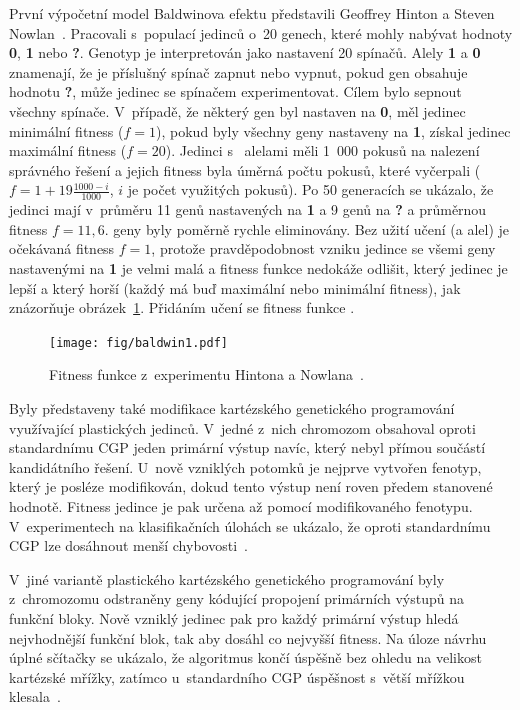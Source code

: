První výpočetní model Baldwinova efektu představili Geoffrey Hinton a Steven Nowlan~\cite{HintonNowlan}. Pracovali s~populací jedinců o~20 genech, které mohly nabývat hodnoty \textbf{0}, \textbf{1} nebo \textbf{?}. Genotyp je interpretován jako nastavení 20 spínačů. Alely \textbf{1} a \textbf{0} znamenají, že je příslušný spínač zapnut nebo vypnut, pokud gen obsahuje hodnotu \textbf{?}, může jedinec se spínačem experimentovat. Cílem bylo sepnout všechny spínače. V~případě, že některý gen byl nastaven na \textbf{0}, měl jedinec minimální fitness ($f = 1$), pokud byly všechny geny nastaveny na \textbf{1}, získal jedinec maximální fitness ($f = 20$). Jedinci s~ alelami měli 1~000 pokusů na nalezení správného řešení a jejich fitness byla úměrná počtu pokusů, které vyčerpali ($f = 1 + 19 \frac{1000 - i}{1000}$, $i$ je počet využitých pokusů). Po 50 generacích se ukázalo, že jedinci mají v~průměru 11 genů nastavených na \textbf{1} a 9 genů na \textbf{?} a průměrnou fitness $f = 11,6$.  geny byly poměrně rychle eliminovány. Bez užití učení (a  alel) je očekávaná fitness $f = 1$, protože pravděpodobnost vzniku jedince se všemi geny nastavenými na \textbf{1} je velmi malá a fitness funkce nedokáže odlišit, který jedinec je lepší a který horší (každý má buď maximální nebo minimální fitness), jak znázorňuje obrázek~\ref{obrHintonNowlan}. Přidáním učení se fitness funkce .

\begin{figure}[htb]
    \centering\texttt{[image: fig/baldwin1.pdf]}
    \caption{Fitness funkce z~experimentu Hintona a Nowlana~\cite{HintonNowlan}.}
    \label{obrHintonNowlan}
\end{figure}

Byly představeny také modifikace kartézského genetického programování využívající plastických jedinců.
V~jedné z~nich chromozom obsahoval oproti standardnímu CGP jeden primární výstup navíc, který nebyl přímou součástí kandidátního řešení. U~nově vzniklých potomků je nejprve vytvořen fenotyp, který je posléze modifikován, dokud tento výstup není roven předem stanovené hodnotě. Fitness jedince je pak určena až pomocí modifikovaného fenotypu. V~experimentech na klasifikačních úlohách se ukázalo, že oproti standardnímu CGP lze dosáhnout menší chybovosti~\cite{UllahPlasticCGP}.

V~jiné variantě plastického kartézského genetického programování byly z~chromozomu odstraněny geny kódující  propojení primárních výstupů na funkční bloky. Nově vzniklý jedinec pak pro každý primární výstup hledá nejvhodnější funkční blok, tak aby dosáhl co nejvyšší fitness. Na úloze návrhu úplné sčítačky se ukázalo, že algoritmus končí úspěšně bez ohledu na velikost kartézské mřížky, zatímco u~standardního CGP úspěšnost s~větší mřížkou klesala~\cite{KhatirPlasticCGP}.

